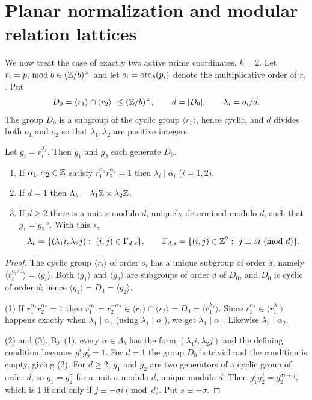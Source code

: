 \section{Planar normalization and modular relation lattices}\label{sec:planar}

We now treat the case of exactly two active prime coordinates, $k=2$. Let $r_i=p_i\bmod b\in(\mathbb Z/b)^\times$ and let $o_i=\operatorname{ord}_b(p_i)$ denote the multiplicative order of $r_i$. Put
\[
  D_0=\langle r_1\rangle\cap\langle r_2\rangle\ \le(\mathbb Z/b)^\times,\qquad d=|D_0|,\qquad \lambda_i=o_i/d.
\]
The group $D_0$ is a subgroup of the cyclic group $\langle r_1\rangle$, hence cyclic, and $d$ divides both $o_1$ and $o_2$ so that $\lambda_1,\lambda_2$ are positive integers.

\begin{proposition}\label{prop:norm}
Let $g_i=r_i^{\lambda_i}$. Then $g_1$ and $g_2$ each generate $D_0$.
\begin{enumerate}
\item If $\alpha_1,\alpha_2\in\mathbb Z$ satisfy $r_1^{\alpha_1}r_2^{\alpha_2}=1$ then $\lambda_i\mid\alpha_i$ ($i=1,2$).
\item If $d=1$ then $\Lambda_b=\lambda_1\mathbb Z\times\lambda_2\mathbb Z$.
\item If $d\ge2$ there is a unit $s$ modulo $d$, uniquely determined modulo $d$, such that $g_1=g_2^{-s}$. With this $s$,
\[
  \Lambda_b=\{(\lambda_1i,\lambda_2j):\ (i,j)\in\Gamma_{d,s}\},\qquad \Gamma_{d,s}=\{(i,j)\in\Z^2:\ j\equiv si\ (\mathrm{mod}\ d)\}.
\]
\end{enumerate}
\end{proposition}
\begin{proof}
The cyclic group $\langle r_i\rangle$ of order $o_i$ has a unique subgroup of order $d$, namely $\langle r_i^{o_i/d}\rangle=\langle g_i\rangle$. Both $\langle g_1\rangle$ and $\langle g_2\rangle$ are subgroups of order $d$ of $D_0$, and $D_0$ is cyclic of order $d$; hence $\langle g_1\rangle=D_0=\langle g_2\rangle$.

(1) If $r_1^{\alpha_1}r_2^{\alpha_2}=1$ then $r_1^{\alpha_1}=r_2^{-\alpha_2}\in\langle r_1\rangle\cap\langle r_2\rangle=D_0=\langle r_1^{\lambda_1}\rangle$. Since $r_1^{\alpha_1}\in\langle r_1^{\lambda_1}\rangle$ happens exactly when $\lambda_1\mid\alpha_1$ (using $\lambda_1\mid o_1$), we get $\lambda_1\mid\alpha_1$. Likewise $\lambda_2\mid\alpha_2$.

(2) and (3). By (1), every $\alpha\in\Lambda_b$ has the form $(\lambda_1i,\lambda_2j)$ and the defining condition becomes $g_1^ig_2^j=1$. For $d=1$ the group $D_0$ is trivial and the condition is empty, giving (2). For $d\ge2$, $g_1$ and $g_2$ are two generators of a cyclic group of order $d$, so $g_1=g_2^{\sigma}$ for a unit $\sigma$ modulo $d$, unique modulo $d$. Then $g_1^ig_2^j=g_2^{\sigma i+j}$, which is $1$ if and only if $j\equiv-\sigma i\pmod d$. Put $s\equiv-\sigma$.
\end{proof}

